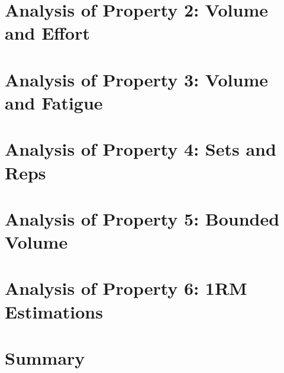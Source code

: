 \section{Analysis of Property 2: Volume and Effort}
\label{sec:VolumeBasePotentialSurfaceProperty2}

\section{Analysis of Property 3: Volume and Fatigue}
\label{sec:VolumeBasePotentialSurfaceProperty3}

\section{Analysis of Property 4: Sets and Reps}
\label{sec:VolumeBasePotentialSurfaceProperty4}

\section{Analysis of Property 5: Bounded Volume}
\label{sec:VolumeBasePotentialSurfaceProperty5}

\section{Analysis of Property 6: 1RM Estimations}
\label{sec:VolumeBasePotentialSurfaceProperty6}

\section{Summary}
